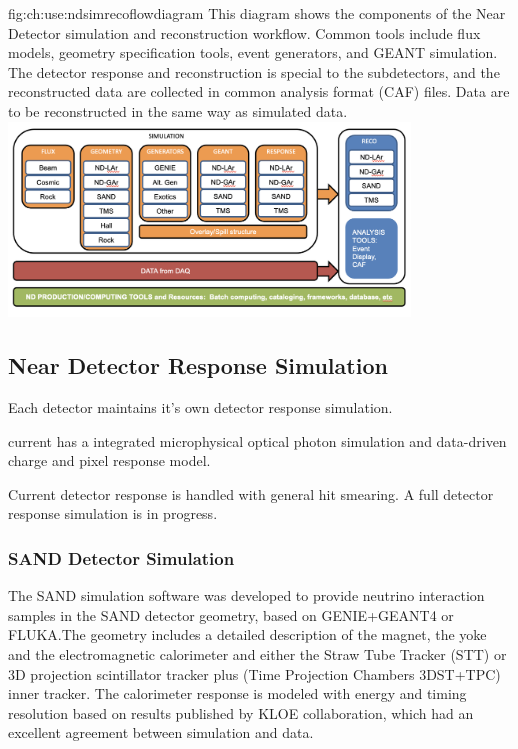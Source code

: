 \documentclass[../main-v1.tex]{subfiles}
\begin{document}
\begin{dunefigure}
{fig:ch:use:ndsimrecoflowdiagram}
{This diagram shows the components of the Near Detector simulation and reconstruction workflow.  Common tools include flux models, geometry specification tools, event generators, and GEANT simulation.  The detector response and reconstruction is special to the subdetectors, and the reconstructed data are collected in common analysis format (CAF) files.  Data are to be reconstructed in the same way as simulated data.}
\includegraphics[width=0.8\textwidth]{graphics/Algo/ND_sim_reco_flowdiagram.png}
\end{dunefigure}

\subsection{Near Detector Response Simulation}

Each detector maintains it's own detector response simulation. 

 current has a integrated microphysical optical photon simulation and data-driven charge and pixel response model. 

Current detector response is handled with general hit smearing. A full detector response simulation is in progress. 

\subsubsection{SAND Detector Simulation}
The SAND simulation software was developed to provide neutrino interaction samples in the SAND detector geometry, based on  GENIE+GEANT4 or FLUKA.The geometry includes a detailed description of the magnet, the yoke and the electromagnetic calorimeter and either the Straw Tube Tracker (STT) or 3D projection scintillator tracker plus (Time Projection Chambers 3DST+TPC) inner tracker. The calorimeter response is modeled  with energy and timing resolution based on results published by KLOE collaboration,
which had an excellent agreement between simulation and data.
\end{document}
